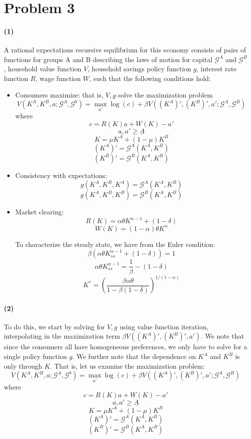 \documentclass[10pt,letter]{article}
\newcommand{\problem}[1]{\section*{Problem #1}}
\newcommand{\problempart}[1]{\paragraph{#1}}
\begin{document}
\pagebreak
\problem{3}
\problempart{(1)}
A rational expectations recursive equilibrium for this economy consists of pairs of functions for groups A and B describing the laws of motion for capital $\mathcal{G}^A$ and $\mathcal{G}^B$, household value function $V$, household savings policy function $g$, interest rate function $R$, wage function $W$, such that the following conditions hold:
\begin{itemize}
\item Consumers maximize: that is, $V, g$ solve the maximization problem
\[ V(K^A, K^B, a; \mathcal{G}^A, \mathcal{G}^b) = \max_{a'} \log(c) + \beta V((K^A)', (K^B)', a'; \mathcal{G}^A, \mathcal{G}^B) \]
where
\[ c = R(K)a + W(K) - a' \]
\[ a, a' \ge \underline{A} \]
\[ K = \mu K^A + (1-\mu) K^B \]
\[ (K^A)' = \mathcal{G}^A(K^A, K^B) \]
\[ (K^B)' = \mathcal{G}^B(K^A, K^B) \]
\item Consistency with expectations:
\[ g(K^A, K^B, K^A) = \mathcal{G}^A(K^A, K^B) \]
\[ g(K^A, K^B, K^B) = \mathcal{G}^B(K^A, K^B) \]
\item Market clearing:
\[ R(K) = \alpha \theta K^{\alpha - 1} + (1-\delta)\]
\[ W(K) = (1-\alpha)\theta K^{\alpha} \]

To characterize the steady state, we have from the Euler condition:
\[ \beta (\alpha \theta K_{ss}^{\alpha - 1} + (1-\delta)) = 1 \]
\[ \alpha \theta K_{ss}^{\alpha - 1} = \frac{1}{\beta} - (1-\delta) \]
\[ K^* = \left(\frac{\beta \alpha \theta}{1 - \beta(1 - \delta)} \right)^{1/(1-\alpha)}\]
\end{itemize}
\problempart{(2)}
To do this, we start by solving for $V, g$ using value function iteration, interpolating in the maximization term $\beta V((K^A)', (K^B)', a')$. We note that since the consumers all have homogeneous preferences, we only have to solve for a single policy function $g$. We further note that the dependence on $K^A$ and $K^B$ is only through $K$. That is, let us examine the maximization problem:
\[ V(K^A, K^B, a; \mathcal{G}^A, \mathcal{G}^b) = \max_{a'} \log(c) + \beta V((K^A)', (K^B)', a'; \mathcal{G}^A, \mathcal{G}^B) \]
where
\[ c = R(K)a + W(K) - a' \]
\[ a, a' \ge \underline{A} \]
\[ K = \mu K^A + (1-\mu) K^B \]
\[ (K^A)' = \mathcal{G}^A(K^A, K^B) \]
\[ (K^B)' = \mathcal{G}^B(K^A, K^B) \]
\end{document}
